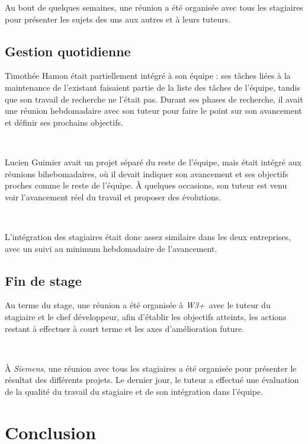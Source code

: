 \documentclass[a4paper, oneside, 12pt]{article}
\newcommand\sectionSpeciale[1]{\addcontentsline{toc}{section}{#1}\section*{#1}}
\def\www{\emph{W3+}}
\def\siemens{\emph{Siemens}}
\begin{document}
Au bout de quelques semaines, une réunion a été organisée avec tous les stagiaires pour présenter les sujets des uns aux autres et à leurs tuteurs.

\vfill

\newpage

\subsection{Gestion quotidienne}

Timothée {\sc Hamon} était partiellement intégré à son équipe : ses tâches liées à la maintenance de l’existant faisaient partie de la liste des tâches de l’équipe, tandis que son travail de recherche ne l’était pas. Durant ses phases de recherche, il avait une réunion hebdomadaire avec son tuteur pour faire le point sur son avancement et définir ses prochains objectifs.

\ 

Lucien {\sc Guimier} avait un projet séparé du reste de l’équipe, mais était intégré aux réunions bihebomadaires, où il devait indiquer son avancement et ses objectifs proches comme le reste de l’équipe. À quelques occasions, son tuteur est venu voir l’avancement réel du travail et proposer des évolutions.

\ 

L’intégration des stagiaires était donc assez similaire dans les deux entreprises, avec un suivi au minimum hebdomadaire de l’avancement.

\subsection{Fin de stage}

Au terme du stage, une réunion a été organisée à \www\ avec le tuteur du stagiaire et le chef développeur, afin d’établir les objectifs atteints, les actions restant à effectuer à court terme et les axes d’amélioration future.

\ 

À \siemens, une réunion avec tous les stagiaires a été organisée pour présenter le résultat des différents projets. Le dernier jour, le tuteur a effectué une évaluation de la qualité du travail du stagiaire et de son intégration dans l’équipe.

\newpage
\sectionSpeciale{Conclusion}
\end{document}
